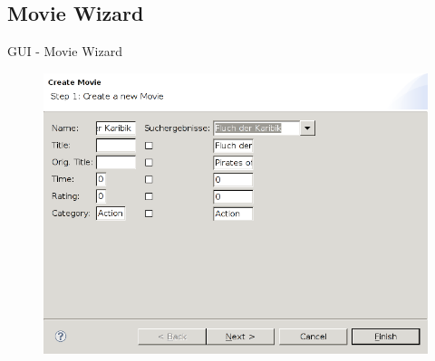 \documentclass{beamer} %
\begin{document}
	\subsection{Movie Wizard}
	\begin{frame}{GUI - Movie Wizard}
		\begin{figure}[H]
			\centering
			\includegraphics[width=\linewidth]{movie-wizard.png}
		\end{figure}
	\end{frame}

	\section{}
	\begin{frame}
	\end{frame}
\end{document}
